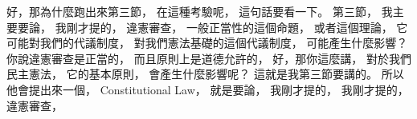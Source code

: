 \hypertarget{w02:cue:799}{}好，那為什麼跑出來第三節，
\hypertarget{w02:cue:800}{}在這種考驗呢，
\hypertarget{w02:cue:801}{}這句話要看一下。
\hypertarget{w02:cue:802}{}第三節，
\hypertarget{w02:cue:803}{}我主要要論，
\hypertarget{w02:cue:804}{}我剛才提的，
\hypertarget{w02:cue:805}{}違憲審查，
\hypertarget{w02:cue:806}{}一般正當性的這個命題，
\hypertarget{w02:cue:807}{}或者這個理論，
\hypertarget{w02:cue:808}{}它可能對我們的代議制度，
\hypertarget{w02:cue:809}{}對我們憲法基礎的這個代議制度，
\hypertarget{w02:cue:810}{}可能產生什麼影響？
\hypertarget{w02:cue:811}{}你說違憲審查是正當的，
\hypertarget{w02:cue:812}{}而且原則上是道德允許的，
\hypertarget{w02:cue:813}{}好，那你這麼講，
\hypertarget{w02:cue:814}{}對於我們民主憲法，
\hypertarget{w02:cue:815}{}它的基本原則，
\hypertarget{w02:cue:816}{}會產生什麼影響呢？
\hypertarget{w02:cue:817}{}這就是我第三節要講的。
\hypertarget{w02:cue:818}{}所以他會提出來一個，
\hypertarget{w02:cue:819}{}Constitutional Law，
\hypertarget{w02:cue:820}{}就是要論，
\hypertarget{w02:cue:821}{}我剛才提的，
\hypertarget{w02:cue:822}{}我剛才提的，
\hypertarget{w02:cue:823}{}違憲審查，

